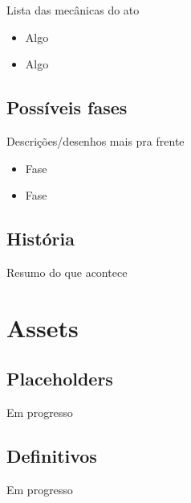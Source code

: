 \documentclass[a4paper, 11pt]{article}
\begin{document}
	Lista das mecânicas do ato 
	\begin{itemize} 
		\item Algo 
		\item Algo 
	\end{itemize} 
 
\subsection{Possíveis fases} 
 
	Descrições/desenhos mais pra frente 
	\begin{itemize} 
		\item Fase 
		\item Fase 
	\end{itemize} 
 
\subsection{História} 
 
	Resumo do que acontece 
 
\section{Assets} 
 
\subsection{Placeholders} 
	Em progresso 
 
\subsection{Definitivos} 
	Em progresso 
 
\end{document}

